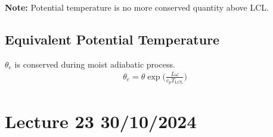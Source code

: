 \documentclass[fleqn,10pt]{SelfArx} %
\begin{document}
\textbf{Note:} Potential temperature is no more conserved quantity above LCL. 


\subsection{Equivalent Potential Temperature}
$\theta_e$ is conserved during moist adiabatic process.
\begin{align}
    \theta_e = \theta \exp\Big(\frac{L\omega}{c_p T_{\text{LCL}}}\Big)
\end{align}

\clearpage

\section{Lecture 23 30/10/2024}
\end{document}
